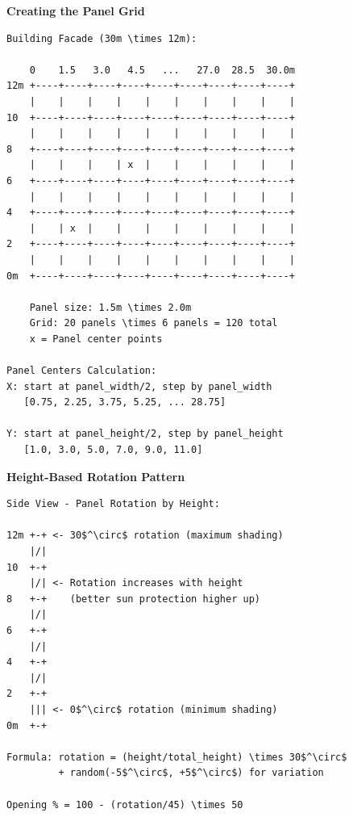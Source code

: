 \begin{tcolorbox}[
    title=Facade Grid Generation (Visual),
    colframe=purple,
    colback = white,
    arc=2mm
]
\textbf{Creating the Panel Grid}
\begin{lstlisting}[basicstyle=\ttfamily\footnotesize,breaklines=true,columns=fullflexible,keepspaces=true,xleftmargin=0pt]
Building Facade (30m \times 12m):
    
    0    1.5   3.0   4.5   ...   27.0  28.5  30.0m
12m +----+----+----+----+----+----+----+----+----+
    |    |    |    |    |    |    |    |    |    |
10  +----+----+----+----+----+----+----+----+----+
    |    |    |    |    |    |    |    |    |    |
8   +----+----+----+----+----+----+----+----+----+
    |    |    |    | x  |    |    |    |    |    |
6   +----+----+----+----+----+----+----+----+----+
    |    |    |    |    |    |    |    |    |    |
4   +----+----+----+----+----+----+----+----+----+
    |    | x  |    |    |    |    |    |    |    |
2   +----+----+----+----+----+----+----+----+----+
    |    |    |    |    |    |    |    |    |    |
0m  +----+----+----+----+----+----+----+----+----+
    
    Panel size: 1.5m \times 2.0m
    Grid: 20 panels \times 6 panels = 120 total
    x = Panel center points

Panel Centers Calculation:
X: start at panel_width/2, step by panel_width
   [0.75, 2.25, 3.75, 5.25, ... 28.75]
   
Y: start at panel_height/2, step by panel_height
   [1.0, 3.0, 5.0, 7.0, 9.0, 11.0]

\end{lstlisting}

\textbf{Height-Based Rotation Pattern}
\begin{lstlisting}[basicstyle=\ttfamily\footnotesize,breaklines=true,columns=fullflexible,keepspaces=true,xleftmargin=0pt]
Side View - Panel Rotation by Height:

12m +-+ <- 30$^\circ$ rotation (maximum shading)
    |/|
10  +-+
    |/| <- Rotation increases with height
8   +-+    (better sun protection higher up)
    |/|
6   +-+
    |/|
4   +-+
    |/|
2   +-+
    ||| <- 0$^\circ$ rotation (minimum shading)
0m  +-+
    
Formula: rotation = (height/total_height) \times 30$^\circ$
         + random(-5$^\circ$, +5$^\circ$) for variation

Opening % = 100 - (rotation/45) \times 50

\end{lstlisting}
\end{tcolorbox}

